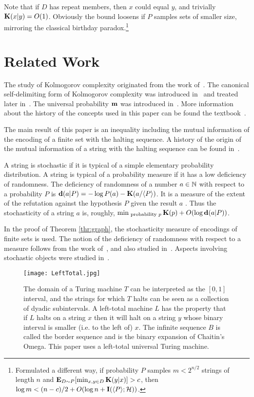 \documentclass[11pt]{article}\textwidth 6.5in\textheight 9in
\begin{document}
Note that if $D$ has repeat members, then $x$ could equal $y$, and trivially ${\mathbf K}(x|y)=O(1)$. Obviously the bound loosens if $P$ samples sets of smaller size, mirroring the classical birthday paradox.\footnote{Formulated a different way, if probability $P$ samples $m<2^{n/2}$ strings of length $n$ and ${\mathbf E}_{D\sim P}[\min_{x,y\in D}{\mathbf K}(y|x)]>c$, then $\log m<(n-c)/2+O(\log n+{\mathbf I}(\langle P\rangle;{\mathcal H}))$.}
\section{Related Work}

The study of Kolmogorov complexity originated from the work of~\citep{Kolmogorov65}. The canonical self-delimiting form of Kolmogorov complexity was introduced in~\citep{ZvonkinLe70} and treated later in~\citep{Chaitin75}. The universal probability ${\mathbf {m}}$ was introduced in~\citep{Solomonoff64}. More information about the history of the concepts used in this paper can be found the textbook~\citep{LiVi08}. 

The main result of this paper is an inequality including the mutual information of the encoding of a finite set with the halting sequence. A history of the origin of the mutual information of a string with the halting sequence can be found in~\citep{VereshchaginVi04v2}.

A string is stochastic if it is typical of a simple elementary probability distribution. A string is typical of a probability measure if it has a low deficiency of randomness. The deficiency of randomness of a number $a\in\mathbb{N}$ with respect to a probability $P$ is ${\mathbf d}(a|P)=-\log P(a)-{\mathbf K}(a/\langle P\rangle)$. It is a measure of the extent of the refutation against the hypothesis $P$ given the result $a$ \cite{Gacs21}. Thus the stochasticity of a string $a$ is, roughly, $\min_{\textrm{ probability }p}{\mathbf K}(p) + O(\log {\mathbf d}(a|P))$.

In the proof of Theorem \ref{thr:graph}, the stochasticity measure of encodings of finite sets is used. The notion of the deficiency of randomness with respect to a measure follows from the work of~\citep{Shen83}, and also studied in~\citep{KolmogorovUs87,Vyugin87,Shen99}. Aspects involving stochastic objects were studied in~\citep{Shen83,Shen99,Vyugin87,Vyugin99}. 

	\begin{figure}               
  \centering
  \texttt{[image: LeftTotal.jpg]}
  \caption{The domain of a Turing machine $T$ can be interpreted as the $[0,1]$ interval, and the strings for which $T$ halts can be seen as a collection of dyadic subintervals. A left-total machine $L$ has the property that if $L$ halts on a string $x$ then it will halt on a string $y$ whose binary interval is smaller (i.e. to the left of) $x$. The infinite sequence $B$ is called the border sequence and is the binary expansion of Chaitin's Omega. This paper uses a left-total universal Turing machine.}
  \label{fig:lefttotal}
\end{figure}
\end{document}
